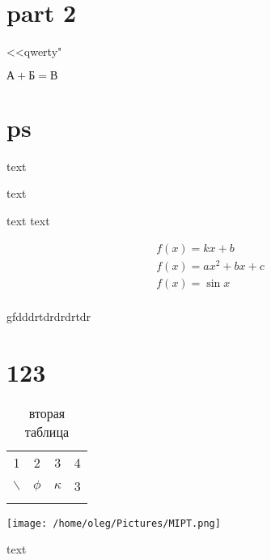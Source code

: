 \documentclass[a4paper, 12pt]{article}
\begin{document}
\section[2]{part 2}
<<qwerty"

$\text{А}+\text{Б}=\text{В}$





\appendix
\section{ps}
text

\vspace{10pt} 

text
\par
text \hspace*{10pt} text

\begin{gather}
    f(x)=kx+b \\
    f(x)=ax^2+bx+c \\
    f(x)=\sin x \\
\end{gather}


\newpage
gfdddrtdrdrdrtdr

\vspace{20pt}

\section{123}
\begin{table}[h]
\begin{tabular}{||c|c|c|c||}
    \hline
    1&2&3&4\\
    \cline{1-2}
    \cline{1-4} 
    $\backslash$&$\phi$&$\kappa$&3\\
    \hline
    \label{second}
    \end{tabular}
    \caption{вторая таблица}
\end{table}

\texttt{[image: /home/oleg/Pictures/MIPT.png]}

\newpage


\textrm{text}


\end{document}
